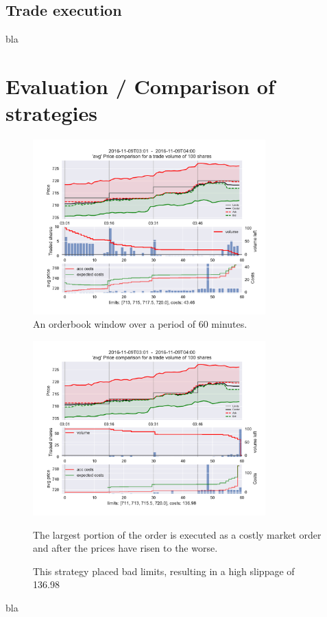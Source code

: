 \subsection{Trade execution}
bla

\section{Evaluation / Comparison of strategies}
\begin{figure}[ht]
	\centering
   \includegraphics[width=0.8\textwidth]{content/drawings/trading_example17_good}
	\caption{An orderbook window over a period of 60 minutes.}
	\label{fig:tradingstrategy17good}
\end{figure}

\begin{figure}[ht]
	\centering
   \includegraphics[width=0.8\textwidth]{content/drawings/trading_example17_bad}
	\caption{This strategy placed bad limits, resulting in a high slippage of 136.98}
	The largest portion of the order is executed as a costly market order and after the prices have risen to the worse.
	\label{fig:tradingstrategy17bad}
\end{figure}



bla













\cleardoublepage{}